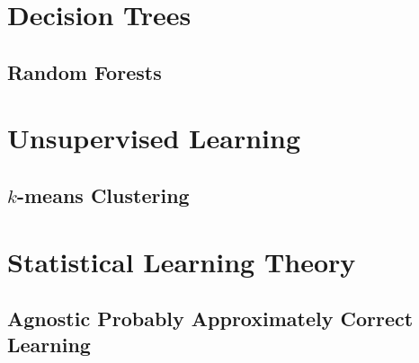 \documentclass[11pt]{report} %
\begin{document}
\section{Decision Trees}

\subsection{Random Forests}

\section{Unsupervised Learning}

\subsection{$k$-means Clustering}

\section{Statistical Learning Theory}

\subsection{Agnostic Probably Approximately Correct Learning \cite{Shalev-Shwartz2014}}
\end{document}
